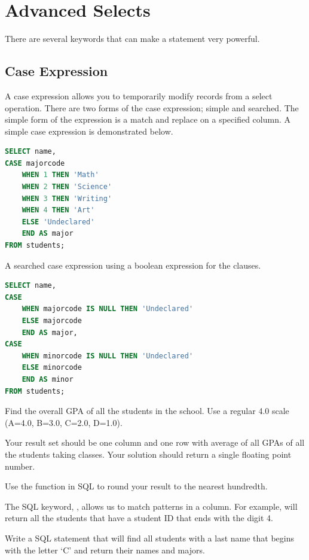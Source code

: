 \section*{Advanced Selects}
There are several keywords that can make a  statement very powerful.

\subsection*{Case Expression}
A case expression allows you to temporarily modify records from a select operation.
There are two forms of the case expression; simple and searched.
The simple form of the expression is a match and replace on a specified column.
A simple case expression is demonstrated below.
\begin{lstlisting}[language=SQL]
SELECT name, 
CASE majorcode 
    WHEN 1 THEN 'Math' 
    WHEN 2 THEN 'Science' 
    WHEN 3 THEN 'Writing' 
    WHEN 4 THEN 'Art' 
    ELSE 'Undeclared' 
    END AS major
FROM students;
\end{lstlisting}

A searched case expression using a boolean expression for the  clauses.
\begin{lstlisting}[language=SQL]
SELECT name, 
CASE 
    WHEN majorcode IS NULL THEN 'Undeclared' 
    ELSE majorcode 
    END AS major, 
CASE 
    WHEN minorcode IS NULL THEN 'Undeclared' 
    ELSE minorcode 
    END AS minor 
FROM students;
\end{lstlisting}

\begin{problem}
Find the overall GPA of all the students in the school.
Use a regular 4.0 scale (A=4.0, B=3.0, C=2.0, D=1.0).

Your result set should be one column and one row with average of all GPAs of all the students taking classes.  
Your solution should return a single floating point number.

Use the  function in SQL to round your result to the nearest hundredth.
\label{prob:studentGPA}
\end{problem}

\begin{problem}
The SQL keyword, , allows us to match patterns in a column.
For example,  will return all the students that have a student ID that ends with the digit 4.

Write a SQL statement that will find all students with a last name that begins with the letter `C' and return their names and majors.
\label{prob:likec}
\end{problem}

\let\undefined\lsql 
